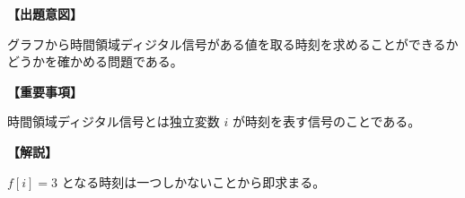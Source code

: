 \noindent \textbf{【出題意図】}

\noindent グラフから時間領域ディジタル信号がある値を取る時刻を求めることができるかどうかを確かめる問題である。

\vspace{1em}
\noindent \textbf{【重要事項】}

\bigskip
\noindent 時間領域ディジタル信号とは独立変数 $i$ が時刻を表す信号のことである。

\vspace{1em}
\noindent \textbf{【解説】}

\noindent $f[i]=3$ となる時刻は一つしかないことから即求まる。

